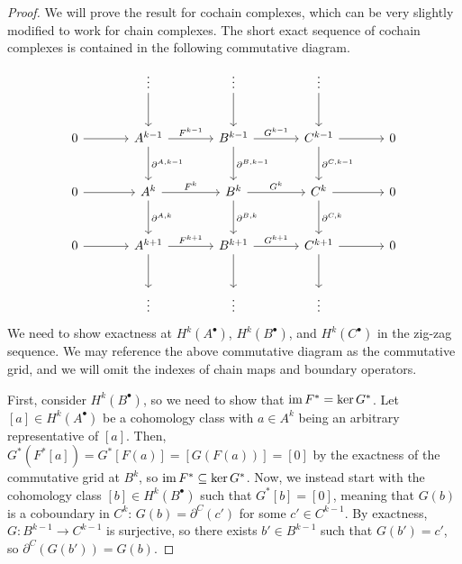 \documentclass[a4paper,12pt]{article}
\begin{document}
\begin{proof}
    We will prove the result for cochain complexes, which can be very slightly modified to work for chain complexes.
    The short exact sequence of cochain complexes is contained in the following commutative diagram.
    \[\begin{tikzcd}[sep=large]
	& \vdots & \vdots & \vdots & \\
	0 & {A^{k-1}} & {B^{k-1}} & {C^{k-1}} & 0 \\
	0 & {A^k} & {B^k} & {C^k} & 0 \\
	0 & {A^{k+1}} & {B^{k+1}} & {C^{k+1}} & 0 \\
	& \vdots & \vdots & \vdots
	\arrow[from=1-2, to=2-2]
	\arrow[from=1-3, to=2-3]
	\arrow[from=1-4, to=2-4]
	\arrow[from=2-1, to=2-2]
	\arrow["{F^{k-1}}", from=2-2, to=2-3]
	\arrow["{\partial^{A, k-1}}", from=2-2, to=3-2]
	\arrow["{G^{k-1}}", from=2-3, to=2-4]
	\arrow["{\partial^{B, k-1}}", from=2-3, to=3-3]
	\arrow[from=2-4, to=2-5]
	\arrow["{\partial^{C, k-1}}", from=2-4, to=3-4]
	\arrow[from=3-1, to=3-2]
	\arrow["{F^k}", from=3-2, to=3-3]
	\arrow["{\partial^{A, k}}", from=3-2, to=4-2]
	\arrow["{G^k}", from=3-3, to=3-4]
	\arrow["{\partial^{B, k}}", from=3-3, to=4-3]
	\arrow[from=3-4, to=3-5]
	\arrow["{\partial^{C, k}}", from=3-4, to=4-4]
	\arrow[from=4-1, to=4-2]
	\arrow["{F^{k+1}}", from=4-2, to=4-3]
	\arrow[from=4-2, to=5-2]
	\arrow["{G^{k+1}}", from=4-3, to=4-4]
	\arrow[from=4-3, to=5-3]
	\arrow[from=4-4, to=4-5]
	\arrow[from=4-4, to=5-4]
    \end{tikzcd}\]
    We need to show exactness at $H^k(A^\bullet)$, $H^k(B^\bullet)$, and $H^k(C^\bullet)$ in the zig-zag sequence.
    We may reference the above commutative diagram as the commutative grid, and we will omit the indexes of chain maps and boundary operators.

    First, consider $H^k(B^\bullet)$, so we need to show that $\operatorname{im} F^* = \ker G^*$.
    Let $[a] \in H^k(A^\bullet)$ be a cohomology class with $a \in A^k$ being an arbitrary representative of $[a]$.
    Then, $G^*(F^*[a]) = G^*[F(a)] = [G(F(a))] = [0]$ by the exactness of the commutative grid at $B^k$, so $\operatorname{im} F^* \subseteq \ker G^*$.
    Now, we instead start with the cohomology class $[b] \in H^k(B^\bullet)$ such that $G^*[b] = [0]$, meaning that $G(b)$ is a coboundary in $C^k$: $G(b) = \partial^C(c')$ for some $c'  \in C^{k-1}$.
    By exactness, $G \colon B^{k-1} \to C^{k-1}$ is surjective, so there exists $b' \in B^{k-1}$ such that $G(b') = c'$, so $\partial^C(G(b')) = G(b)$.


\end{proof}
\end{document}
